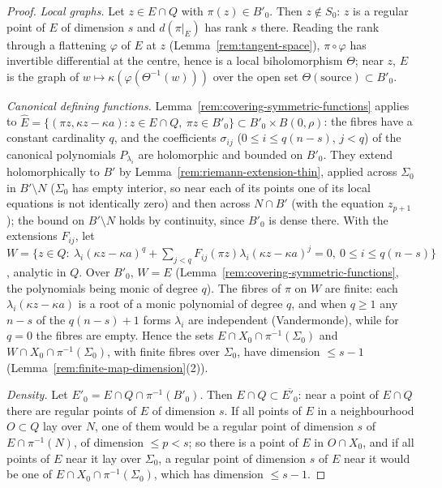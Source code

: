 \begin{proof}
\emph{Local graphs.} Let \(z\in E\cap Q\) with \(\pi(z)\in B'_0\). Then \(z\notin S_0\): \(z\) is a regular point of \(E\) of dimension \(s\) and
\(d(\pi|_E)\) has rank \(s\) there. Reading the rank through a flattening \(\varphi\) of \(E\) at \(z\) (Lemma~\ref{rem:tangent-space}), \(\pi\circ\varphi\) has
invertible differential at the centre, hence is a local biholomorphism \(\Theta\); near \(z\), \(E\) is the graph of \(w\mapsto\kappa(\varphi(\Theta^{-1}(w)))\) over
the open set \(\Theta(\text{source})\subset B'_0\).

\emph{Canonical defining functions.} Lemma~\ref{rem:covering-symmetric-functions} applies to \(\hat E=\{(\pi z,\kappa z-\kappa a):z\in E\cap Q,\ \pi z\in
B'_0\}\subset B'_0\times B(0,\rho)\): the fibres have a constant cardinality \(q\), and the coefficients \(\sigma_{ij}\) (\(0\le i\le q(n-s)\), \(j<q\)) of the
canonical polynomials \(P_{\lambda_i}\) are holomorphic and bounded on \(B'_0\). They extend holomorphically to \(B'\) by
Lemma~\ref{rem:riemann-extension-thin}, applied across \(\Sigma_0\) in \(B'\setminus N\) (\(\Sigma_0\) has empty interior, so near each of its points one
of its local equations is not identically zero) and then across \(N\cap B'\) (with the equation \(z_{p+1}\)); the bound on \(B'\setminus N\) holds by
continuity, since \(B'_0\) is dense there. With the extensions \(F_{ij}\), let
\(W=\{z\in Q:\ \lambda_i(\kappa z-\kappa a)^q+\sum_{j<q}F_{ij}(\pi z)\lambda_i(\kappa z-\kappa a)^j=0,\ 0\le i\le q(n-s)\}\), analytic in \(Q\). Over
\(B'_0\), \(W=E\) (Lemma~\ref{rem:covering-symmetric-functions}, the polynomials being monic of degree \(q\)). The fibres of \(\pi\) on \(W\) are finite: each
\(\lambda_i(\kappa z-\kappa a)\) is a root of a monic polynomial of degree \(q\), and when \(q\ge1\) any \(n-s\) of the \(q(n-s)+1\) forms \(\lambda_i\) are
independent (Vandermonde), while for \(q=0\) the fibres are empty. Hence the sets \(E\cap X_0\cap\pi^{-1}(\Sigma_0)\) and \(W\cap X_0\cap\pi^{-1}(\Sigma_0)\),
with finite fibres over \(\Sigma_0\), have dimension \(\le s-1\) (Lemma~\ref{rem:finite-map-dimension}(2)).

\emph{Density.} Let \(E'_0=E\cap Q\cap\pi^{-1}(B'_0)\). Then \(E\cap Q\subset\overline{E'_0}\): near a point of \(E\cap Q\) there are regular points of
\(E\) of dimension \(s\). If all points of \(E\) in a neighbourhood \(O\subset Q\) lay over \(N\), one of them would be a regular point of dimension \(s\) of
\(E\cap\pi^{-1}(N)\), of dimension \(\le p<s\); so there is a point of \(E\) in \(O\cap X_0\), and if all points of \(E\) near it lay over \(\Sigma_0\), a regular
point of dimension \(s\) of \(E\) near it would be one of \(E\cap X_0\cap\pi^{-1}(\Sigma_0)\), which has dimension \(\le s-1\).


\end{proof}
